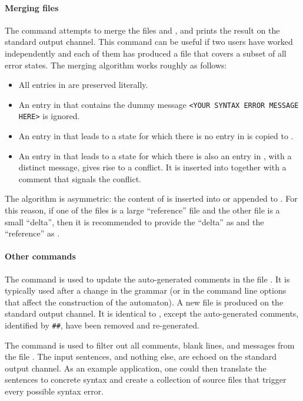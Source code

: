 \documentclass[onecolumn,11pt,nocopyrightspace,preprint]{sigplanconf}
\begin{document}
\paragraph{Merging \messages files}
\label{sec:messages:merge}

The command \omergeerrors {} \omergeerrors {} attempts
to merge the \messages files  and , and prints the
result on the standard output channel. This command can be useful if two users
have worked independently and each of them has produced a \messages file that
covers a subset of all error states. The merging algorithm works roughly as
follows:
%
\begin{itemize}
\item All entries in  are preserved literally.
\item An entry in  that contains the dummy message
  \verb+<YOUR SYNTAX ERROR MESSAGE HERE>+ is ignored.
\item An entry in  that leads to a state for which
  there is no entry in  is copied to .
\item An entry in  that leads to a state for which
  there is also an entry in , with a distinct message,
  gives rise to a conflict. It is inserted into 
  together with a comment that signals the conflict.
\end{itemize}
%
The algorithm is asymmetric: the content of  is inserted into or
appended to . For this reason, if one of the files is a large
``reference'' file and the other file is a small ``delta'', then it is
recommended to provide the ``delta'' as  and the ``reference''
as .

\paragraph{Other commands}

The command \oupdateerrors {} is used to update the auto-generated
comments in the \messages file . It is typically used after a
change in the grammar (or in the command line options that affect the
construction of the automaton). A new \messages file is produced on the
standard output channel. It is identical to , except the
auto-generated comments, identified by \verb+##+, have been removed and
re-generated.

The command \oechoerrors {} is used to filter out all comments,
blank lines, and messages from the \messages file . The input
sentences, and nothing else, are echoed on the standard output channel. As an
example application, one could then translate the sentences to concrete syntax
and create a collection of source files that trigger every possible syntax
error.
\end{document}
